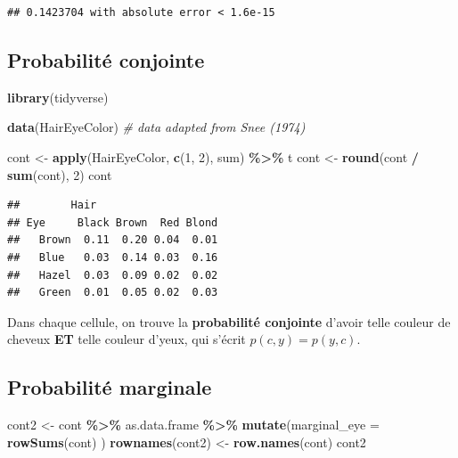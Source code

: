 \documentclass[
  a4paper,11pt,twoside,onecolumn,openright,final,oldfontcommands]{memoir}
\newenvironment{Shaded}{\begin{snugshade}}{\end{snugshade}}
\newcommand{\CommentTok}[1]{\textcolor[rgb]{0.56,0.35,0.01}{\textit{#1}}}
\newcommand{\DataTypeTok}[1]{\textcolor[rgb]{0.13,0.29,0.53}{#1}}
\newcommand{\DecValTok}[1]{\textcolor[rgb]{0.00,0.00,0.81}{#1}}
\newcommand{\KeywordTok}[1]{\textcolor[rgb]{0.13,0.29,0.53}{\textbf{#1}}}
\newcommand{\NormalTok}[1]{#1}
\newcommand{\OperatorTok}[1]{\textcolor[rgb]{0.81,0.36,0.00}{\textbf{#1}}}
\newcommand{\StringTok}[1]{\textcolor[rgb]{0.31,0.60,0.02}{#1}}
\theoremstyle{definition}
\theoremstyle{definition}
\theoremstyle{definition}
\theoremstyle{remark}
\begin{document}
\begin{verbatim}
## 0.1423704 with absolute error < 1.6e-15
\end{verbatim}

\hypertarget{probabilituxe9-conjointe}{%
\subsection{Probabilité conjointe}\label{probabilituxe9-conjointe}}

\begin{Shaded}
\begin{Highlighting}[]
\KeywordTok{library}\NormalTok{(tidyverse)}

\KeywordTok{data}\NormalTok{(HairEyeColor) }\CommentTok{\# data adapted from Snee (1974)}

\NormalTok{cont \textless{}{-}}\StringTok{ }\KeywordTok{apply}\NormalTok{(HairEyeColor, }\KeywordTok{c}\NormalTok{(}\DecValTok{1}\NormalTok{, }\DecValTok{2}\NormalTok{), sum) }\OperatorTok{\%\textgreater{}\%}\StringTok{ }\NormalTok{t }
\NormalTok{cont \textless{}{-}}\StringTok{ }\KeywordTok{round}\NormalTok{(cont }\OperatorTok{/}\StringTok{ }\KeywordTok{sum}\NormalTok{(cont), }\DecValTok{2}\NormalTok{)}
\NormalTok{cont}
\end{Highlighting}
\end{Shaded}

\begin{verbatim}
##        Hair
## Eye     Black Brown  Red Blond
##   Brown  0.11  0.20 0.04  0.01
##   Blue   0.03  0.14 0.03  0.16
##   Hazel  0.03  0.09 0.02  0.02
##   Green  0.01  0.05 0.02  0.03
\end{verbatim}

Dans chaque cellule, on trouve la \textbf{probabilité conjointe} d'avoir telle couleur de cheveux \textbf{ET} telle couleur d'yeux, qui s'écrit \(p(c,y)=p(y,c)\).

\hypertarget{probabilituxe9-marginale}{%
\subsection{Probabilité marginale}\label{probabilituxe9-marginale}}

\begin{Shaded}
\begin{Highlighting}[]
\NormalTok{cont2 \textless{}{-}}\StringTok{ }\NormalTok{cont }\OperatorTok{\%\textgreater{}\%}\StringTok{ }\NormalTok{as.data.frame }\OperatorTok{\%\textgreater{}\%}\StringTok{ }\KeywordTok{mutate}\NormalTok{(}\DataTypeTok{marginal\_eye =} \KeywordTok{rowSums}\NormalTok{(cont) )}
\KeywordTok{rownames}\NormalTok{(cont2) \textless{}{-}}\StringTok{ }\KeywordTok{row.names}\NormalTok{(cont)}
\NormalTok{cont2}
\end{Highlighting}
\end{Shaded}
\end{document}
